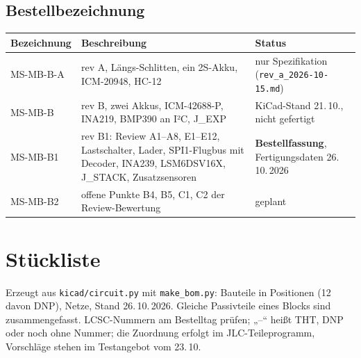 \documentclass[10pt,a4paper,twoside]{article}
\newcommand{\pn}{MS-MB-B1}
\begin{document}
\subsection*{Bestellbezeichnung}
\begin{tabularx}{\textwidth}{L{22mm} X L{52mm}}
\toprule
\textbf{Bezeichnung} & \textbf{Beschreibung} & \textbf{Status}\\
\midrule
MS-MB-B-A & rev A, Längs-Schlitten, ein 2S-Akku, ICM-20948, HC-12 & nur Spezifikation (\texttt{rev\_a\_2026-10-15.md})\\
MS-MB-B & rev B, zwei Akkus, ICM-42688-P, INA219, BMP390 an I²C, J\_EXP & KiCad-Stand 21.\,10., nicht gefertigt\\
\pn{} & rev B1: Review A1--A8, E1--E12, Lastschalter, Lader, SPI1-Flugbus mit Decoder, INA239, LSM6DSV16X, J\_STACK, Zusatzsensoren & \textbf{Bestellfassung}, Fertigungsdaten 26.\,10.\,2026\\
MS-MB-B2 & offene Punkte B4, B5, C1, C2 der Review-Bewertung & geplant\\
\bottomrule
\end{tabularx}

\section{Stückliste}\label{sec:bom}
Erzeugt aus \texttt{kicad/circuit.py} mit \texttt{make\_bom.py}: \bomParts{} Bauteile in \bomLines{} Positionen (12 davon DNP), \bomNets{} Netze, Stand 26.\,10.\,2026. Gleiche Passivteile eines Blocks sind zusammengefasst. LCSC-Nummern am Bestelltag prüfen; „–“ heißt THT, DNP oder noch ohne Nummer; die Zuordnung erfolgt im JLC-Teileprogramm, Vorschläge stehen im Testangebot vom 23.\,10.

\small

\normalsize
\end{document}
